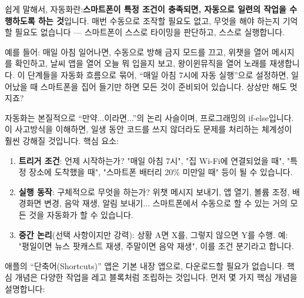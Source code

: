 


쉽게 말해서, 자동화란:\textbf{스마트폰이 특정 조건이 충족되면, 자동으로 일련의 작업을 수행하도록 하는 것}입니다. 매번 수동으로 조작할 필요도 없고, 무엇을 해야 하는지 기억할 필요도 없습니다 — 스마트폰이 스스로 타이밍을 판단하고, 스스로 실행합니다.

예를 들어: 매일 아침 일어나면, 수동으로 방해 금지 모드를 끄고, 위챗을 열어 메시지를 확인하고, 날씨 앱을 열어 오늘 뭐 입을지 보고, 왕이윈뮤직을 열어 노래를 재생합니다. 이 단계들을 자동화 흐름으로 묶어, “매일 아침 7시에 자동 실행”으로 설정하면, 일어났을 때 스마트폰을 집어 들기만 하면 모든 것이 준비되어 있습니다. 상상만 해도 멋지죠?

자동화는 본질적으로 “만약...이라면...”의 논리 사슬이며, 프로그래밍의 if-else입니다. 이 사고방식을 이해하면, 일생 동안 코드를 쓰지 않더라도 문제를 처리하는 체계성이 훨씬 강해질 것입니다. 핵심 요소:

\begin{enumerate}
  \item \textbf{트리거 조건}: 언제 시작하는가? "매일 아침 7시", "집 Wi-Fi에 연결되었을 때", "특정 장소에 도착했을 때", "스마트폰 배터리 20\% 미만일 때" 등이 될 수 있습니다.
  \item \textbf{실행 동작}: 구체적으로 무엇을 하는가? 위챗 메시지 보내기, 앱 열기, 볼륨 조정, 배경화면 변경, 음악 재생, 알림 보내기... 스마트폰에서 수동으로 할 수 있는 거의 모든 것을 자동화가 할 수 있습니다.
  \item \textbf{중간 논리}(선택 사항이지만 강력): 상황 A면 X를, 그렇지 않으면 Y를 수행. 예: "평일이면 뉴스 팟캐스트 재생, 주말이면 음악 재생", 이를 조건 분기라고 합니다.
\end{enumerate}


애플의 “단축어(Shortcuts)” 앱은 기본 내장 앱으로, 다운로드할 필요가 없습니다. 핵심 개념은 다양한 작업을 레고 블록처럼 조립하는 것입니다. 먼저 몇 가지 핵심 개념을 설명합니다:

